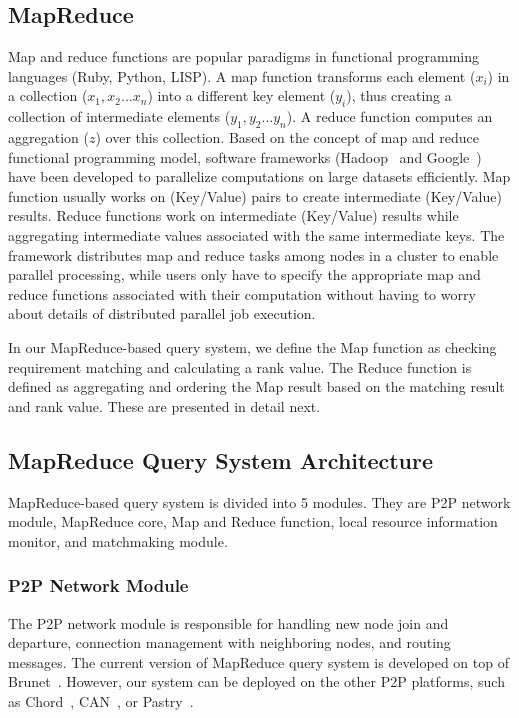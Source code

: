 \documentclass{acm_proc_article-sp}
\begin{document}
\subsection{MapReduce}
Map and reduce functions are popular paradigms in functional programming languages (Ruby, Python, LISP). 
A map function transforms each element ($x_i$) in a collection ({$x_1, x_2... x_n$}) into a different key element ($y_i$), thus creating a collection of intermediate elements ({$y_1, y_2... y_n$}).
A reduce function computes an aggregation ($z$) over this collection. 
Based on the concept of map and reduce functional programming model, software frameworks (Hadoop~\cite{hadoop} and Google~\cite{google_mapreduce}) have been developed to parallelize computations on large datasets efficiently. 
Map function usually works on (Key/Value) pairs to create intermediate (Key/Value) results. 
Reduce functions work on intermediate (Key/Value) results while aggregating intermediate values associated with the same intermediate keys. 
The framework distributes map and reduce tasks among nodes in a cluster to enable parallel processing, while users only have to specify the appropriate map and reduce functions associated with their computation without having to worry about details of distributed parallel job execution.  

In our MapReduce-based query system, we define the Map function as checking requirement matching and calculating a rank value. The Reduce function is defined as 
aggregating and ordering the Map result based on the matching result and rank value. These are presented in detail next.

\subsection{MapReduce Query System Architecture}
MapReduce-based query system is divided into 5 modules. They are P2P network module, MapReduce core, Map and Reduce function, local resource information monitor, and matchmaking module.
\subsubsection{P2P Network Module}
The P2P network module is responsible for handling new node join and departure, connection management with neighboring nodes, and routing messages. 
The current version of MapReduce query system is developed on top of Brunet~\cite{brunet}.
However, our system can be deployed on the other P2P platforms, such as Chord~\cite{chord}, CAN~\cite{can}, or Pastry~\cite{pastry}.
\end{document}
